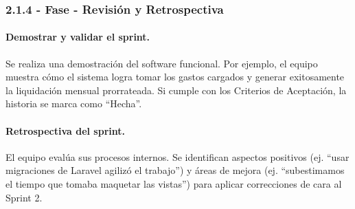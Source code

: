 \subsubsection{2.1.4 - Fase - Revisión y Retrospectiva}

\paragraph{Demostrar y validar el sprint.}
Se realiza una demostración del software funcional. Por ejemplo, el equipo muestra cómo el sistema logra tomar los gastos cargados y generar exitosamente la liquidación mensual prorrateada. Si cumple con los Criterios de Aceptación, la historia se marca como ``Hecha''. 

\paragraph{Retrospectiva del sprint.}
El equipo evalúa sus procesos internos. Se identifican aspectos positivos (ej. ``usar migraciones de Laravel agilizó el trabajo'') y áreas de mejora (ej. ``subestimamos el tiempo que tomaba maquetar las vistas'') para aplicar correcciones de cara al Sprint 2.

